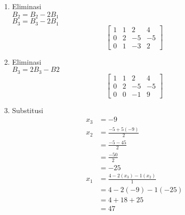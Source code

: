 \documentclass{uofa-eng-assignment}
\begin{document}
\begin{enumerate}
\begin{enumerate}
                    \begin{enumerate}
                        \item Eliminasi \\
                              $B_2 = B_2 - 2B_1$ \\
                              $B_3 = B_3 - 2B_1$ \\
                              \begin{equation}
                                  \begin{bmatrix}
                                      1 & 1 & 2  & 4  \\
                                      0 & 2 & -5 & -5 \\
                                      0 & 1 & -3 & 2
                                  \end{bmatrix}
                              \end{equation}
                        \item Eliminasi \\
                              $B_3 = 2B_3 - B2$\\
                              \begin{equation}
                                  \begin{bmatrix}
                                      1 & 1 & 2  & 4  \\
                                      0 & 2 & -5 & -5 \\
                                      0 & 0 & -1 & 9
                                  \end{bmatrix}
                              \end{equation}
                        \item Substitusi \\
                              \begin{equation}
                                  \begin{split}
                                      x_3 & = -9 \\
                                      x_2 & = \frac{-5+5(-9)}{2} \\
                                      & = \frac{-5-45}{2} \\
                                      & = \frac{-50}{2} \\
                                      & = -25 \\
                                      x_1 & = \frac{4-2(x_3)-1(x_2)}{1} \\
                                      & = 4-2(-9)-1(-25) \\
                                      & = 4+18+25 \\
                                      & = 47 \\
                                  \end{split}
                              \end{equation}
                    \end{enumerate}


\end{enumerate}
\end{enumerate}
\end{document}
